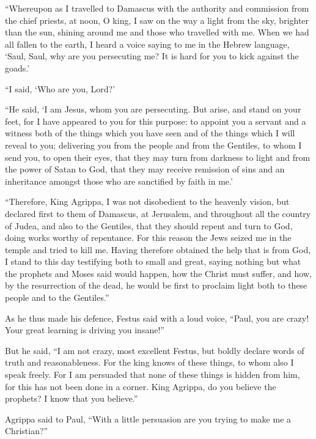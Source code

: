  ``Whereupon as I travelled to Damascus with the authority
and commission from the chief priests,  at noon, O king, I
saw on the way a light from the sky, brighter than the sun, shining
around me and those who travelled with me.  When we had all
fallen to the earth, I heard a voice saying to me in the Hebrew
language, `Saul, Saul, why are you persecuting me? It is hard for you to
kick against the goads.'

 ``I said, `Who are you, Lord?'

``He said, `I am Jesus, whom you are persecuting.  But
arise, and stand on your feet, for I have appeared to you for this
purpose: to appoint you a servant and a witness both of the things which
you have seen and of the things which I will reveal to you;
 delivering you from the people and from the Gentiles, to
whom I send you,  to open their eyes, that they may turn
from darkness to light and from the power of Satan to God, that they may
receive remission of sins and an inheritance amongst those who are
sanctified by faith in me.'

 ``Therefore, King Agrippa, I was not disobedient to the
heavenly vision,  but declared first to them of Damascus,
at Jerusalem, and throughout all the country of Judea, and also to the
Gentiles, that they should repent and turn to God, doing works worthy of
repentance.  For this reason the Jews seized me in the
temple and tried to kill me.  Having therefore obtained the
help that is from God, I stand to this day testifying both to small and
great, saying nothing but what the prophets and Moses said would happen,
 how the Christ must suffer, and how, by the resurrection
of the dead, he would be first to proclaim light both to these people
and to the Gentiles.''

 As he thus made his defence, Festus said with a loud
voice, ``Paul, you are crazy! Your great learning is driving you
insane!''

 But he said, ``I am not crazy, most excellent Festus, but
boldly declare words of truth and reasonableness.  For the
king knows of these things, to whom also I speak freely. For I am
persuaded that none of these things is hidden from him, for this has not
been done in a corner.  King Agrippa, do you believe the
prophets? I know that you believe.''

 Agrippa said to Paul, ``With a little persuasion are you
trying to make me a Christian?''

